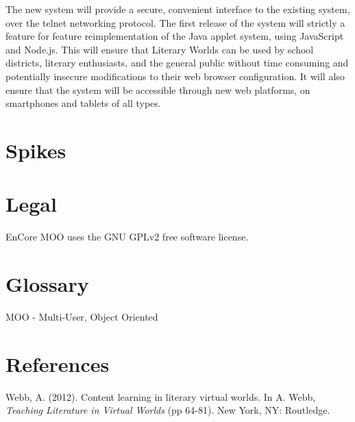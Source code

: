 \documentclass[12pt, letterpaper]{report}
\begin{document}
	\par
	The new system will provide a secure, convenient interface to the existing system, over the telnet networking protocol. The first release of the system will strictly a feature for feature reimplementation of the Java applet system, using JavaScript and Node.js. This will ensure that Literary Worlds can be used by school districts, literary enthusiasts, and the general public without time consuming and potentially insecure modifications to their web browser configuration. It will also ensure that the system will be accessible through new web platforms, on smartphones and tablets of all types.
	
	
	\chapter{Spikes}
	
	\chapter{Legal}
	\par
	EnCore MOO uses the GNU GPLv2 free software license.
	
	
	\chapter{Glossary}
	\par
	MOO - Multi-User, Object Oriented
	\par
	
	
	
	\chapter{References}
	\begin{bibliography}{9}

 	Webb, A. (2012). Content learning in literary virtual worlds.
  	In A. Webb, \emph{Teaching Literature in Virtual Worlds} 
  	(pp 64-81).
  	New York, NY: Routledge.

	\end{bibliography}

	
	
\end{document}
